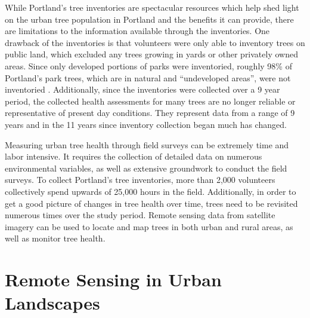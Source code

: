 \documentclass[12pt,twoside]{reedthesis}
\begin{document}
While Portland's tree inventories are spectacular resources which help
shed light on the urban tree population in Portland and the benefits it
can provide, there are limitations to the information available through
the inventories. One drawback of the inventories is that volunteers were
only able to inventory trees on public land, which excluded any trees
growing in yards or other privately owned areas. Since only developed
portions of parks were inventoried, roughly 98\% of Portland's park
trees, which are in natural and ``undeveloped areas'', were not
inventoried . Additionally, since the inventories were collected over a
9 year period, the collected health assessments for many trees are no
longer reliable or representative of present day conditions. They
represent data from a range of 9 years and in the 11 years since
inventory collection began much has changed.

Measuring urban tree health through field surveys can be extremely time
and labor intensive. It requires the collection of detailed data on
numerous environmental variables, as well as extensive groundwork to
conduct the field surveys. To collect Portland's tree inventories, more
than 2,000 volunteers collectively spend upwards of 25,000 hours in the
field. Additionally, in order to get a good picture of changes in tree
health over time, trees need to be revisited numerous times over the
study period. Remote sensing data from satellite imagery can be used to
locate and map trees in both urban and rural areas, as well as monitor
tree health.

\hypertarget{remote-sensing-in-urban-landscapes}{%
\section{Remote Sensing in Urban Landscapes}\label{remote-sensing-in-urban-landscapes}}
\end{document}
